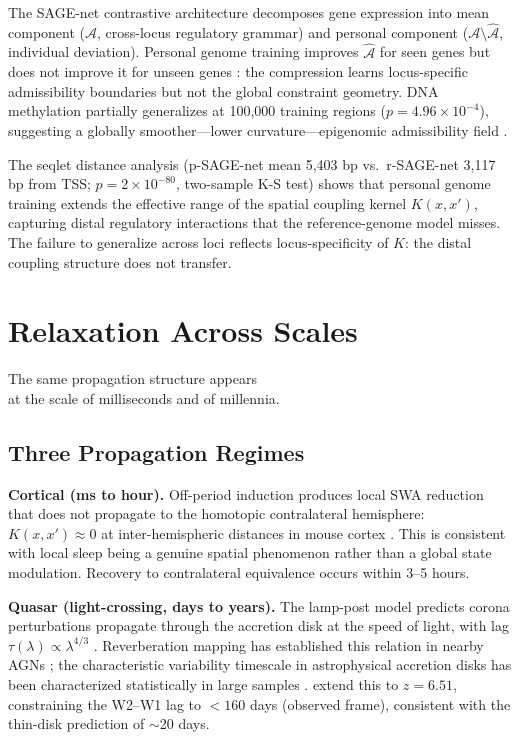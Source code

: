 \documentclass[12pt, a4paper, twoside]{book}
\theoremstyle{definition}
\theoremstyle{remark}
\newcommand{\Adm}{\mathcal{A}}
\begin{document}
The SAGE-net contrastive architecture decomposes gene expression into mean component ($\hat{\Adm}$, cross-locus regulatory grammar) and personal component ($\Adm \setminus \hat{\Adm}$, individual deviation). Personal genome training improves $\hat{\Adm}$ for seen genes but does not improve it for unseen genes \citep{spiro2026}: the compression learns locus-specific admissibility boundaries but not the global constraint geometry. DNA methylation partially generalizes at 100,000 training regions ($p = 4.96 \times 10^{-4}$), suggesting a globally smoother---lower curvature---epigenomic admissibility field \citep{spiro2026}.

The seqlet distance analysis (p-SAGE-net mean 5,403 bp vs.\ r-SAGE-net 3,117 bp from TSS; $p = 2 \times 10^{-80}$, two-sample K-S test) shows that personal genome training extends the effective range of the spatial coupling kernel $K(x,x')$, capturing distal regulatory interactions \citep{karollus2023} that the reference-genome model misses. The failure to generalize across loci reflects locus-specificity of $K$: the distal coupling structure does not transfer.

\chapter{Relaxation Across Scales}
\label{ch:scales}

\epigraph{The same propagation structure appears\\
  at the scale of milliseconds and of millennia.}{}

\section{Three Propagation Regimes}

\textbf{Cortical (ms to hour).} Off-period induction produces local SWA reduction that does not propagate to the homotopic contralateral hemisphere: $K(x,x') \approx 0$ at inter-hemispheric distances in mouse cortex \citep{driessen2026}. This is consistent with local sleep being a genuine spatial phenomenon \citep{vyazovskiy2011, huber2004} rather than a global state modulation. Recovery to contralateral equivalence occurs within 3--5 hours.

\textbf{Quasar (light-crossing, days to years).} The lamp-post model predicts corona perturbations propagate through the accretion disk at the speed of light, with lag $\tau(\lambda) \propto \lambda^{4/3}$ \citep{peterson1993, cackett2020, fausnaugh2016}. Reverberation mapping has established this relation in nearby AGNs \citep{mchardy2018, fausnaugh2016, cackett2020}; the characteristic variability timescale in astrophysical accretion disks has been characterized statistically in large samples \citep{burke2021}. \citet{leung2026} extend this to $z = 6.51$, constraining the W2--W1 lag to $<160$ days (observed frame), consistent with the thin-disk prediction of $\sim$20 days.
\end{document}
